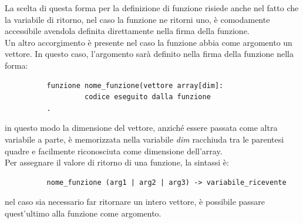 \documentclass[11pt, a4paper, twoside, notitlepage]{report}
\begin{document}
La scelta di questa forma per la definizione di funzione risiede anche nel fatto
che la variabile di ritorno, nel caso la funzione ne ritorni uno, è comodamente
accessibile avendola definita direttamente nella firma della funzione.
\\Un altro accorgimento è presente nel caso la funzione abbia come argomento un
vettore. In questo caso, l'argomento sarà definito nella firma della funzione
nella forma:

\begin{verbatim}
          funzione nome_funzione(vettore array[dim]:
                   codice eseguito dalla funzione
          .
\end{verbatim}

in questo modo la dimensione del vettore, anziché essere passata come
altra variabile a parte, è memorizzata nella variabile \emph{dim} racchiuda tra
le parentesi quadre e facilmente riconosciuta come dimensione dell'array.
\\Per assegnare il valore di ritorno di una funzione, la sintassi è:
\begin{verbatim}
          nome_funzione (arg1 | arg2 | arg3) -> variabile_ricevente
\end{verbatim}
nel caso sia necessario far ritornare un intero vettore, è possibile passare
quest'ultimo alla funzione come argomento.
\end{document}
